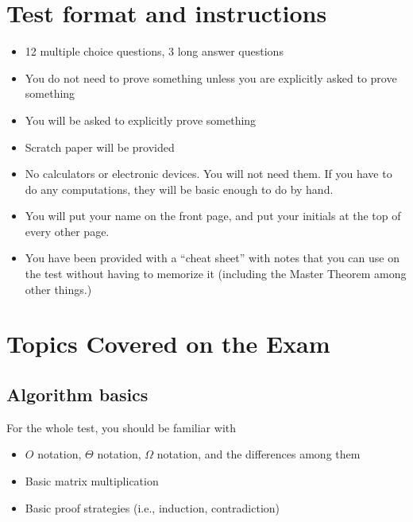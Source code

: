 \documentclass[11  pt]{exam}
\begin{document}
	
	
	
	
	\section{Test format and instructions}
	
	\begin{itemize}
		\item 12 multiple choice questions, 3 long answer questions
		\item You do not need to prove something unless you are explicitly asked to prove something
		\item You will be asked to explicitly prove something 
		\item Scratch paper will be provided
		\item No calculators or electronic devices. You will not need them. If you have to do any computations, they will be basic enough to do by hand.
		\item You will put your name on the front page, and put your initials at the top of every other page.
		\item You have been provided with a ``cheat sheet'' with notes that you can use on the test without having to memorize it (including the Master Theorem among other things.) 
	\end{itemize}
	
	\newpage 
	
	\section{Topics Covered on the Exam}
	
	\subsection{Algorithm basics}
	For the whole test, you should be familiar with
	\begin{itemize}
		\item $O$ notation, $\Theta$ notation, $\Omega$ notation, and the differences among them
		\item Basic matrix multiplication
		\item Basic proof strategies (i.e., induction, contradiction)
	\end{itemize}
	
\end{document}
